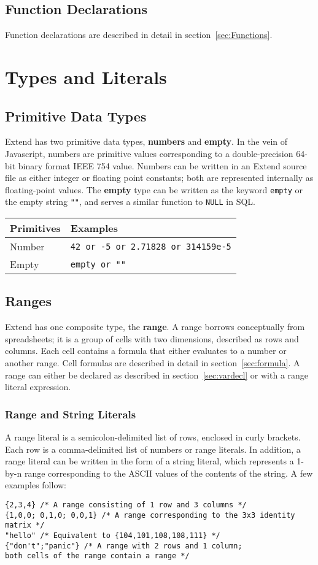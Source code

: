 	\subsection{Function Declarations}
		Function declarations are described in detail in section~\ref{sec:Functions}.
\section{Types and Literals}
	\subsection{Primitive Data Types}
		Extend has two primitive data types, \textbf{numbers} and \textbf{empty}. In the vein of Javascript, numbers are primitive values corresponding to a double-precision 64-bit binary format IEEE 754 value. Numbers can be written in an Extend source file as either integer or floating point constants; both are represented internally as floating-point values. The \textbf{empty} type can be written as the keyword \texttt{empty} or the empty string \texttt{""}, and serves a similar function to \texttt{NULL} in SQL.
		\newline
		\begin{table}[H]
		\centering
		\begin{tabular} {| l | l |}
			\hline
			\textbf{Primitives} & \textbf{Examples} \\ \hline
			Number & \texttt{42 or -5 or 2.71828 or 314159e-5} \\ \hline
			Empty & \texttt{empty or ""} \\ \hline
		\end{tabular}
		\end{table}
	\subsection{Ranges}
		Extend has one composite type, the \textbf{range}. A range borrows conceptually from spreadsheets; it is a group of cells with two dimensions, described as rows and columns. Each cell contains a formula that either evaluates to a number or another range. Cell formulas are described in detail in section~\ref{sec:formula}. A range can either be declared as described in section~\ref{sec:vardecl} or with a range literal expression.
\subsubsection{Range and String Literals}
		A range literal is a semicolon-delimited list of rows, enclosed in curly brackets. Each row is a comma-delimited list of numbers or range literals. In addition, a range literal can be written in the form of a string literal, which represents a 1-by-n range corresponding to the ASCII values of the contents of the string. A few examples follow: 
		
\begin{lstlisting}
{2,3,4} /* A range consisting of 1 row and 3 columns */
{1,0,0; 0,1,0; 0,0,1} /* A range corresponding to the 3x3 identity matrix */
"hello" /* Equivalent to {104,101,108,108,111} */
{"don't";"panic"} /* A range with 2 rows and 1 column; 
both cells of the range contain a range */
\end{lstlisting}
